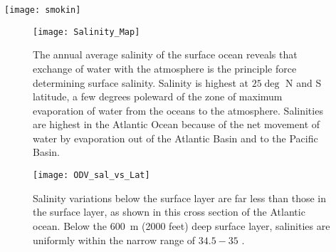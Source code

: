 \documentclass[amstex,12pt]{book}
\begin{document}
{\newpage
\begin{sidewaysfigure}[ht]
\centering
    \texttt{[image: smokin]}
    \caption{Two examples of hydrothermal vents, spectacular examples of interactions between the oceans and the hot volcanic rocks found at mid-ocean ridges. On the left panel, super-heated water emerges from natural ``chimneys.''  The white solids form when hot fluids mix with cooler seawater, forming the chimneys. The white precipitates include compounds of barium, calcium and silicon. In the right panel, water at \SI{340}{\celsius} ($650\circ F$) emerges from a vent at a depth of \SI{2200}{\metre} ($7200\ ft$). The black precipitates are metal sulphides ($FeS$), which likely include iron, copper, manganese and zinc. When these ``black smoker'' vents were first discovered, it became clear that the world's most important copper deposits formed in similar locations in Earth's distant past. Credits: While from NOAA web sites, the copyright for thee mages is unclear. I do NOT yet have certain rights to these photographs. Left panel URL points to \href{http://oceanexplorer.noaa.gov/okeanos/explorations/10index/logs/slideshow/ex_july_highlights/gallery/hires/white_plumes_hires.jpg}{NOAA}, as does the right panel \href{http://oceanexplorer.noaa.gov/okeanos/explorations/10index/background/hires/boardwalk_black_smoker_hires.jpg}{URL}.}
    \label{fig:smokers}
\end{sidewaysfigure}

\newpage
\begin{figure}[p]
\centering
  \texttt{[image: Salinity\_Map]}%
\caption{The annual average salinity of the surface ocean reveals that exchange of water with the atmosphere is the principle force determining surface salinity. Salinity is highest at $25\deg$ N and S latitude, a few degrees poleward of the zone of maximum evaporation of water from the oceans to the atmosphere. Salinities are highest in the Atlantic Ocean because of the net movement of water by evaporation out of the Atlantic Basin and to the Pacific Basin. }
\label{fig:surf_salinity}
\end{figure}


\begin{figure}[p]
\centering
  \texttt{[image: ODV\_sal\_vs\_Lat]}%
\caption{Salinity variations below the surface layer are far less than those in the surface layer, as shown in this cross section of the Atlantic ocean. Below the \SI{600}{\metre} (2000 feet) deep surface layer, salinities are uniformly within the narrow range of $34.5-35$ \textperthousand.}  
\label{fig:salinity_sect}  
\end{figure}

}
\end{document}
